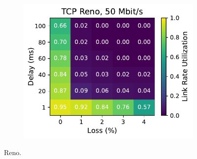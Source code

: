\begin{figure}[ht]
\begin{subfigure}[b]{1cm}
        \includegraphics[width=\linewidth,trim={8cm 0 0 0},clip]{figures/heatmaps/heatmap_tcp_reno_50mbps.pdf}
        \vspace*{0.01cm}
    \end{subfigure}
    \caption{Reno.}
\end{figure}